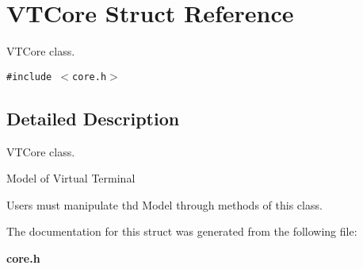 \section{VTCore Struct Reference}
\label{structVTCore}
VTCore class. 


{\tt \#include $<$core.h$>$}



\subsection{Detailed Description}
VTCore class.

Model of Virtual Terminal \par
 Users must manipulate thd Model through methods of this class. \par
 



The documentation for this struct was generated from the following file:\begin{CompactItemize}
\item 
{\bf core.h}\end{CompactItemize}
